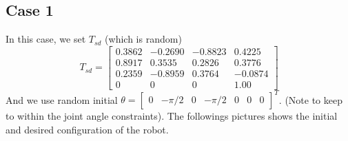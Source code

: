 \documentclass[english,10pt,a4paper]{article}
\begin{document}
    \subsection*{Case 1}
    In this case, we set $T_{sd}$ (which is random)
    \begin{equation}
        T_{sd} = \begin{bmatrix}
            0.3862 & -0.2690 & -0.8823 & 0.4225\\
            0.8917 & 0.3535 & 0.2826 & 0.3776\\
            0.2359 & -0.8959 & 0.3764 &  -0.0874\\
            0 & 0 & 0 & 1.00
        \end{bmatrix}
    \end{equation}
    And we use random initial \(\theta = \begin{bmatrix}
        0 & -\pi/2 & 0 & -\pi/2 & 0 & 0 & 0 \end{bmatrix}^T\). (Note to keep to within the joint angle constraints). The followings pictures shows the initial and desired configuration of the robot.
\end{document}

